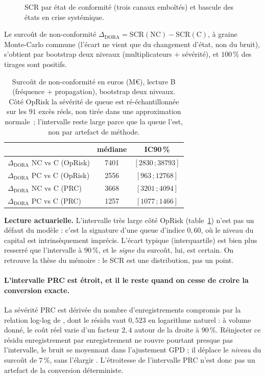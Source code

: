 \begin{figure}[htbp]\centering
{}
\caption{SCR par état de conformité (trois canaux emboîtés) et bascule des états en crise
systémique.}
\label{fig:multietats}
\end{figure}

Le surcoût de non-conformité $\Delta_{\text{DORA}}=\mathrm{SCR}(\text{NC})-\mathrm{SCR}(\text{C})$,
à graine Monte-Carlo commune (l'écart ne vient que du changement d'état, non du bruit),
s'obtient par bootstrap deux niveaux (multiplicateurs $+$ sévérité), et $100\,\%$ des tirages
sont positifs.

\begin{table}[htbp]\centering\small
\renewcommand{\arraystretch}{1.25}
\begin{tabular}{@{}l cc@{}}
\toprule
& médiane & IC90\,\% \\
\midrule
$\Delta_{\text{DORA}}$ NC vs C (OpRisk) & 7401 & $[2830\,;38793]$ \\
$\Delta_{\text{DORA}}$ PC vs C (OpRisk) & 2556 & $[963\,;12768]$  \\
$\Delta_{\text{DORA}}$ NC vs C (PRC)    & 3668 & $[3201\,;4094]$  \\
$\Delta_{\text{DORA}}$ PC vs C (PRC)    & 1257 & $[1077\,;1466]$  \\
\bottomrule
\end{tabular}
\caption{Surcoût de non-conformité en euros (M\euro), lecture B (fréquence $+$ propagation),
bootstrap deux niveaux. Côté OpRisk la sévérité de queue est ré-échantillonnée sur les
$91$ excès réels, non tirée dans une approximation
normale~; l'intervalle reste large parce que la queue l'est, non par artefact de méthode.}
\label{tab:delta}
\end{table}

\noindent \textbf{Lecture actuarielle.} L'intervalle très large côté OpRisk
(table~\ref{tab:delta}) n'est pas un défaut
du modèle : c'est la signature d'une queue d'indice $0{,}60$, où le niveau du capital est
intrinsèquement imprécis. L'écart typique (interquartile) est bien plus resserré que
l'intervalle à $90\,\%$, et le \emph{signe} du surcoût, lui, est certain. On retrouve la thèse du
mémoire : le SCR est une distribution, pas un point.

\paragraph{L'intervalle PRC est étroit, et il le reste quand on cesse de croire la conversion
exacte.} La sévérité PRC est dérivée du nombre d'enregistrements compromis par la relation
log-log de \citet{jacobs2014}, dont le résidu vaut $0{,}523$ en logarithme naturel : à volume donné,
le coût réel varie d'un facteur $2{,}4$ autour de la droite à $90\,\%$. Réinjecter ce résidu
enregistrement par enregistrement ne rouvre pourtant presque pas l'intervalle, le bruit se
moyennant dans l'ajustement GPD ; il déplace le \emph{niveau} du surcoût de $7\,\%$, sans
l'élargir \matcomp. L'étroitesse de l'intervalle PRC n'est donc pas un artefact
de la conversion déterministe.


